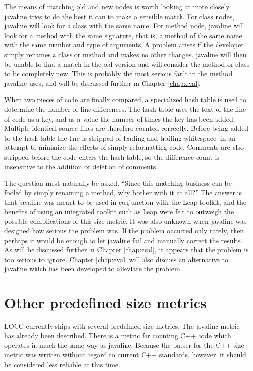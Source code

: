 The means of matching old and new nodes is worth looking at more
closely.  {\sc javaline} tries to do the best it can to make a sensible match.
For class nodes, {\sc javaline} will look for a class with the same name.  For
method node, {\sc javaline} will look for a method with the same signature, that 
is, a method of the same name with the same number and type of
arguments.  A problem arises  if the developer simply renames a
class or method and makes no other changes. {\sc javaline} will then be unable to
find a match in the old version and will consider the method or class
to be completely new.  This is probably the most serious fault in the
method {\sc javaline} uses, and will be discussed further in Chapter
\ref{chap:eval}. 

When two pieces of code are finally compared, a specialized hash table 
is used to determine the number of line differences.  The hash table
uses the text of the line of code as a key, and as a value the number of times the 
key has been added.  Multiple identical source lines are therefore
counted correctly.  Before being added to the hash table the line is
stripped of leading and trailing whitespace, in an attempt to minimize 
the effects of simply reformatting code.  Comments are also stripped
before the code enters the hash table, so the difference count is
insensitive to the addition or deletion of comments.

The question must naturally be asked, ``Since this matching business can be 
fooled by simply renaming a method, why bother with it at all?''  The
answer is that {\sc javaline} was meant to be used in conjunction with the
Leap toolkit, and the benefits of using an integrated toolkit such as Leap
were felt to outweigh the possible complications of this size metric.
It was also unknown when {\sc javaline} was designed how serious the
problem was.  If the problem occurred only rarely, then perhaps it would be
enough to let {\sc javaline} fail and manually correct the results.  As
will be discussed further in Chapter \ref{chap:eval}, it appears that the
problem is too serious to ignore.  Chapter \ref{chap:eval} will also discuss 
an alternative to {\sc javaline} which has been developed to alleviate the
problem.

\section{Other predefined size metrics}

LOCC currently ships with several predefined size metrics.  The {\sc
  javaline} metric has already been described.  There is a metric for
counting C++ code which operates in much the same way as {\sc javaline}.
Because the parser for the C++ size metric was written without regard to
current C++ standards, however, it should be considered less reliable at
this time.

